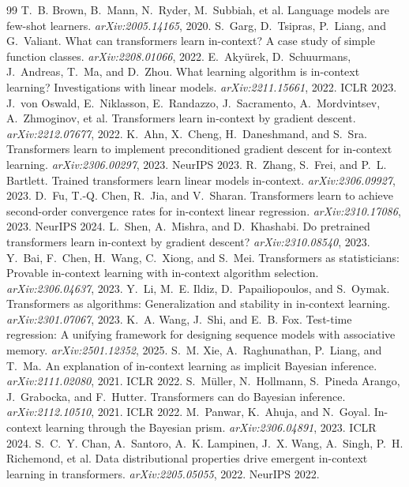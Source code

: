 \documentclass{article}
\begin{document}
\clearpage
\begin{thebibliography}{99}\small
{} T.~B. Brown, B.~Mann, N.~Ryder, M.~Subbiah, et al. Language models are few-shot learners. \emph{arXiv:2005.14165}, 2020.
 S.~Garg, D.~Tsipras, P.~Liang, and G.~Valiant. What can transformers learn in-context? A case study of simple function classes. \emph{arXiv:2208.01066}, 2022.
 E.~Aky\"urek, D.~Schuurmans, J.~Andreas, T.~Ma, and D.~Zhou. What learning algorithm is in-context learning? Investigations with linear models. \emph{arXiv:2211.15661}, 2022. ICLR 2023.
 J.~von Oswald, E.~Niklasson, E.~Randazzo, J.~Sacramento, A.~Mordvintsev, A.~Zhmoginov, et al. Transformers learn in-context by gradient descent. \emph{arXiv:2212.07677}, 2022.
 K.~Ahn, X.~Cheng, H.~Daneshmand, and S.~Sra. Transformers learn to implement preconditioned gradient descent for in-context learning. \emph{arXiv:2306.00297}, 2023. NeurIPS 2023.
 R.~Zhang, S.~Frei, and P.~L. Bartlett. Trained transformers learn linear models in-context. \emph{arXiv:2306.09927}, 2023.
 D.~Fu, T.-Q. Chen, R.~Jia, and V.~Sharan. Transformers learn to achieve second-order convergence rates for in-context linear regression. \emph{arXiv:2310.17086}, 2023. NeurIPS 2024.
 L.~Shen, A.~Mishra, and D.~Khashabi. Do pretrained transformers learn in-context by gradient descent? \emph{arXiv:2310.08540}, 2023.
 Y.~Bai, F.~Chen, H.~Wang, C.~Xiong, and S.~Mei. Transformers as statisticians: Provable in-context learning with in-context algorithm selection. \emph{arXiv:2306.04637}, 2023.
 Y.~Li, M.~E. Ildiz, D.~Papailiopoulos, and S.~Oymak. Transformers as algorithms: Generalization and stability in in-context learning. \emph{arXiv:2301.07067}, 2023.
 K.~A. Wang, J.~Shi, and E.~B. Fox. Test-time regression: A unifying framework for designing sequence models with associative memory. \emph{arXiv:2501.12352}, 2025.
 S.~M. Xie, A.~Raghunathan, P.~Liang, and T.~Ma. An explanation of in-context learning as implicit Bayesian inference. \emph{arXiv:2111.02080}, 2021. ICLR 2022.
 S.~M\"uller, N.~Hollmann, S.~Pineda Arango, J.~Grabocka, and F.~Hutter. Transformers can do Bayesian inference. \emph{arXiv:2112.10510}, 2021. ICLR 2022.
 M.~Panwar, K.~Ahuja, and N.~Goyal. In-context learning through the Bayesian prism. \emph{arXiv:2306.04891}, 2023. ICLR 2024.
 S.~C.~Y. Chan, A.~Santoro, A.~K. Lampinen, J.~X. Wang, A.~Singh, P.~H. Richemond, et al. Data distributional properties drive emergent in-context learning in transformers. \emph{arXiv:2205.05055}, 2022. NeurIPS 2022.

\end{thebibliography}
\end{document}
